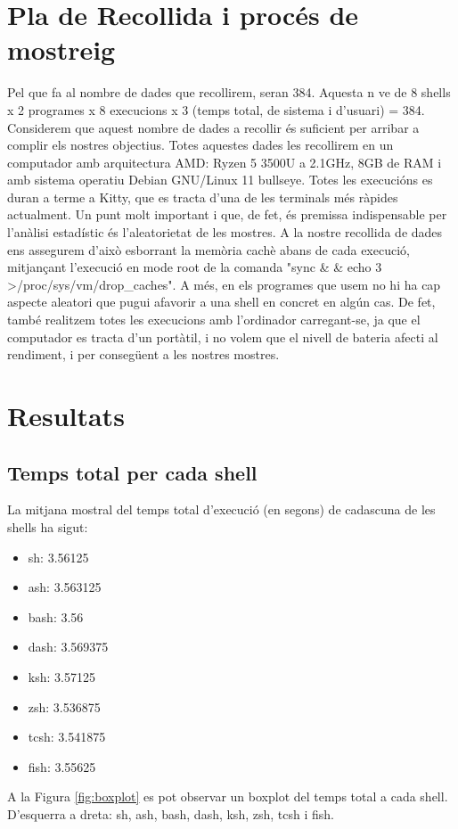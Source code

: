 \documentclass[12pt]{article}
\begin{document}
\section{Pla de Recollida i procés de mostreig}
Pel que fa al nombre de dades que recollirem, seran 384. Aquesta n ve de 8 shells x 2 programes x 8 
execucions x 3 (temps total, de sistema i d'usuari) = 384. Considerem que aquest nombre de dades a 
recollir és suficient per arribar a complir els nostres objectius. Totes aquestes dades les recollirem en 
un computador amb arquitectura AMD: Ryzen 5 3500U a 2.1GHz, 8GB de RAM i amb sistema operatiu Debian GNU/Linux 11 bullseye. 
Totes les execucións es duran a terme a Kitty, que es tracta d'una de les terminals més ràpides actualment.
Un punt molt important i que, de fet, és premissa indispensable per l'anàlisi estadístic és l'aleatorietat
de les mostres. A la nostre recollida de dades ens assegurem d'això esborrant la memòria cachè abans de cada execució, 
mitjançant l'execució en mode root de la comanda "sync \& \& echo 3 \textgreater /proc/sys/vm/drop\_caches". A més,
en els programes que usem no hi ha cap aspecte aleatori que pugui afavorir a una shell en concret en algún cas. De fet,
també realitzem totes les execucions amb l'ordinador carregant-se, ja que el computador es tracta d'un portàtil, i no 
volem que el nivell de bateria afecti al rendiment, i per consegüent a les nostres mostres.

\section{Resultats}
\subsection{Temps total per cada shell}
La mitjana mostral del temps total d'execució (en segons) de cadascuna de les shells ha sigut:
\begin{itemize}
  \item sh: 3.56125
  \item ash: 3.563125
  \item bash: 3.56 
  \item dash: 3.569375
  \item ksh: 3.57125
  \item zsh: 3.536875
  \item tcsh: 3.541875
  \item fish: 3.55625
\end{itemize}

A la Figura \ref{fig:boxplot} es pot observar un boxplot del temps total a cada shell. D'esquerra a dreta: sh, ash,
bash, dash, ksh, zsh, tcsh i fish.
\end{document}
